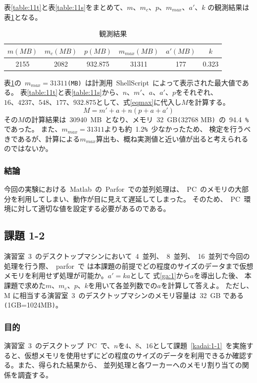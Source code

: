 \documentclass[10pt]{jarticle}
\begin{document}
表\ref{table:11t}と表\ref{table:11s}をまとめて、$m、 m_{c}、p、m_{max}、a'、k$ の観測結果は表\ref{table:11}となる。
\begin{table}[htbp]
	\centering
	\caption{観測結果}
	\label{table:11}
	\begin{tabular}{|c|c|c|c|c|c|}
		\hline
		$m(MB)$ & $m_c(MB)$ & $p(MB)$ & $m_{max}(MB)$ & $a'(MB)$ & $k$\\
		\hline
		2155 & 2082 & 932.875 & 31311 & 177 & 0.323 \\
		\hline
	\end{tabular}
\end{table}
表\ref{table:11}の\ $m_{max} = 31311$\verb|(MB)|\ は計測用\ ShellScript\ によって表示された最大値である。
表\ref{table:11t}と表\ref{table:11s}から、$ n、m'、a、a'、p $をそれぞれ、$16、4237、548、177、932.875 $として、式\ref{eqmax}に代入し$M$を計算する。
\begin{equation}
M = m' + a + n(p + a + a') \label{eqmax}
\end{equation}
その$M$の計算結果は\ 30940\ MB\ となり、メモリ\ 32\ GB\verb|(|32768 MB\verb|)|\ の\ 94.4\ \verb|%|であった。
また、$m_{max}=31311$よりも約\ 1.2\verb|%|\ 少なかったため、
検定を行うべきであるが、計算による$m_{max}$算出も、概ね実測値と近い値が出ると考えられるのではないか。

\subsubsection{結論}
%
今回の実験における\ Matlab\ の\ Parfor\ での並列処理は、\ PC\ のメモリの大部分を利用してしまい、動作が目に見えて遅延してしまった。
そのため、\ PC\ 環境に対して適切な値を設定する必要があるのである。
%

\subsection{課題 1-2}
演習室\ 3\ のデスクトップマシンにおいて\ 4\ 並列、\ 8\ 並列、\ 16\ 並列で今回の処理を行う際、\ parfor\ で
は本課題の前提でどの程度のサイズのデータまで仮想メモリを利用せず処理が可能か。$a' = ka$として
式\ref{ga:1}から$ a $を導出した後、 本課題で求めた$ m、m_{c}、p、k $を用いて各並列数での$ a $を計算して答えよ。
ただし、M に相当する演習室\ 3\ のデスクトップマシンのメモリ容量は\ 32\ GB である \verb|(|1GB=1024MB\verb|)|。
\subsubsection{目的}
%
演習室\ 3\ のデスクトップ\ PC\ で、$ n $を$ 4、8、16 $として課題\ \ref{kadai:1-1}\ 
を実施すると、仮想メモリを使用せずにどの程度のサイズのデータを利用できるか確認する。また、得られた結果から、
並列処理と各ワーカーへのメモリ割り当ての関係を調査する。
%
\end{document}
